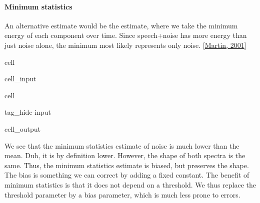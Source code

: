\documentclass[letterpaper,10pt,english]{jupyterBook}
\begin{document}
\paragraph{Minimum statistics}
\label{\detokenize{Enhancement/Noise_attenuation:minimum-statistics}}
\sphinxAtStartPar
An alternative estimate would be the  estimate, where we take the minimum energy of each component over time. Since speech+noise has more energy than just noise alone, the minimum most likely represents only noise. {[}\hyperlink{cite.Enhancement/Noise_attenuation:id40}{Martin, 2001}{]}

\begin{sphinxuseclass}{cell}\begin{sphinxVerbatimInput}

\begin{sphinxuseclass}{cell_input}
\begin{sphinxVerbatim}[commandchars=\\\{\}]
  
\end{sphinxVerbatim}

\end{sphinxuseclass}\end{sphinxVerbatimInput}

\end{sphinxuseclass}
\begin{sphinxuseclass}{cell}
\begin{sphinxuseclass}{tag_hide-input}\begin{sphinxVerbatimOutput}

\begin{sphinxuseclass}{cell_output}
\noindent{}

\end{sphinxuseclass}\end{sphinxVerbatimOutput}

\end{sphinxuseclass}
\end{sphinxuseclass}
\sphinxAtStartPar
We see that the minimum statistics estimate of noise is much lower than the mean. Duh, it is by definition lower. However, the shape of both spectra is the same. Thus, the minimum statistics estimate is biased, but preserves the shape. The bias is something we can correct by adding a fixed constant. The benefit of minimum statistics is that it does not depend on a threshold. We thus replace the threshold parameter by a bias parameter, which is much less prone to errors.
\end{document}

